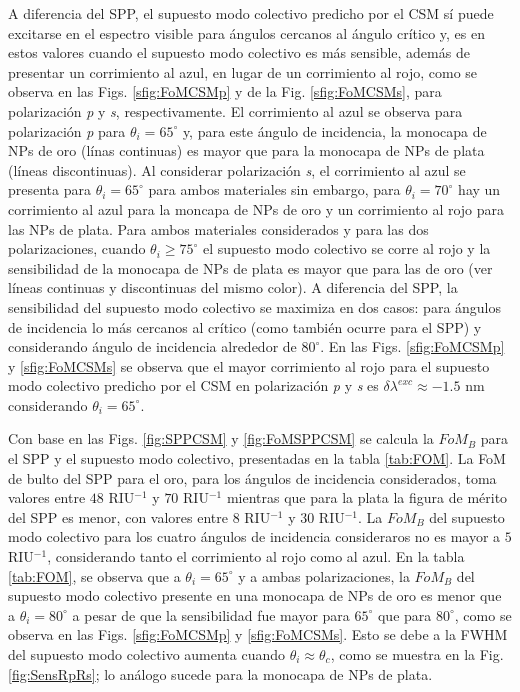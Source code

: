 A diferencia del SPP, el supuesto modo colectivo predicho por el CSM sí puede excitarse en el espectro visible para ángulos cercanos al ángulo crítico y, es en estos valores cuando el supuesto modo colectivo es más sensible, además de presentar un corrimiento al azul, en lugar de un corrimiento al rojo, como se observa en las Figs. \ref{sfig:FoMCSMp} y de la Fig. \ref{sfig:FoMCSMs}, para polarización \emph{p} y \emph{s}, respectivamente. El corrimiento al azul se observa para polarización \emph{p} para $\theta_i=65^\circ$ y, para este ángulo de incidencia, la monocapa de NPs de oro (línas continuas) es mayor que para la monocapa de NPs de plata (líneas discontinuas). Al considerar polarización \emph{s}, el corrimiento al azul se presenta para $\theta_i=65^\circ$ para ambos materiales sin embargo, para $\theta_i=70^\circ$ hay un corrimiento al azul para la moncapa de NPs de oro y un corrimiento al rojo para las NPs de plata. Para ambos materiales considerados y para las dos polarizaciones, cuando $\theta_i\geq 75^\circ$ el supuesto modo colectivo se corre al rojo y la sensibilidad de la monocapa de NPs de plata es mayor que para las de oro (ver líneas continuas y discontinuas del mismo color). A diferencia del SPP, la sensibilidad del supuesto modo colectivo se maximiza en dos casos: para ángulos de incidencia lo más cercanos al crítico (como también ocurre para el SPP)  y considerando ángulo de incidencia alrededor de $80^\circ$.   En las Figs. \ref{sfig:FoMCSMp} y \ref{sfig:FoMCSMs} se observa que el mayor corrimiento al rojo para el supuesto modo colectivo predicho por el CSM en polarización \emph{p} y \emph{s} es $\delta\lambda^{exc} \approx -1.5$ nm considerando $\theta_i=65^\circ$.

Con base en las Figs. \ref{fig:SPPCSM} y \ref{fig:FoMSPPCSM} se calcula la $\textit{FoM}_B$ para el SPP y el supuesto modo colectivo, presentadas en la tabla \ref{tab:FOM}. La FoM de bulto del SPP para el oro, para los ángulos de incidencia considerados, toma valores entre $48$ RIU$^{-1}$  y $70$ RIU$^{-1}$  mientras que para la plata la figura de mérito del SPP es menor, con valores entre $8$ RIU$^{-1}$ y $30$ RIU$^{-1}$. La $\textit{FoM}_B$ del supuesto modo colectivo para los cuatro ángulos de incidencia consideraros no es mayor a $5$ RIU$^{-1}$, considerando tanto el corrimiento al rojo como al azul. En la tabla \ref{tab:FOM}, se observa que a $\theta_i=65^\circ$ y a ambas polarizaciones, la $\textit{FoM}_B$ del supuesto modo colectivo presente en una monocapa de NPs de oro es menor que a $\theta_i=80^\circ$ a pesar de que la sensibilidad fue mayor para $65^\circ$ que para $80^\circ$, como se observa en las Figs. \ref{sfig:FoMCSMp} y \ref{sfig:FoMCSMs}. Esto se debe a la FWHM del supuesto modo colectivo aumenta cuando $\theta_i\approx\theta_c$, como se muestra en la Fig. \ref{fig:SensRpRs}; lo análogo sucede para la monocapa de NPs de plata. 

